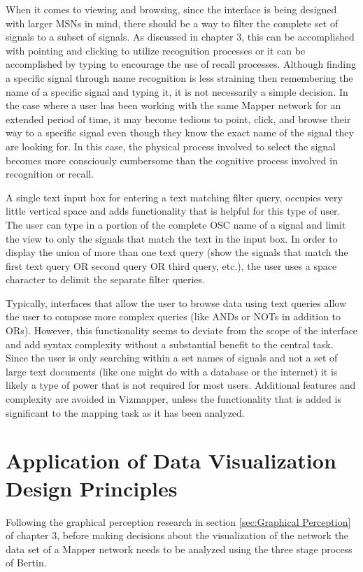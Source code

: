 When it comes to viewing and browsing, since the interface is being designed with larger MSNs in mind, there should be a way to filter the complete set of signals to a subset of signals. As discussed in chapter 3, this can be accomplished with pointing and clicking to utilize recognition processes or it can be accomplished by typing to encourage the use of recall processes. Although finding a specific signal through name recognition is less straining then remembering the name of a specific signal and typing it, it is not necessarily a simple decision. In the case where a user has been working with the same Mapper network for an extended period of time, it may become tedious to point, click, and browse their way to a specific signal even though they know the exact name of the signal they are looking for. In this case, the physical process involved to select the signal becomes more consciously cumbersome than the cognitive process involved in recognition or recall.

A single text input box for entering a text matching filter query, occupies very little vertical space and adds functionality that is helpful for this type of user. The user can type in a portion of the complete OSC name of a signal and limit the view to only the signals that match the text in the input box. In order to display the union of more than one text query (show the signals that match the first text query OR second query OR third query, etc.), the user uses a space character to delimit the separate filter queries. 

Typically, interfaces that allow the user to browse data using text queries allow the user to compose more complex queries (like ANDs or NOTs in addition to ORs). However, this functionality seems to deviate from the scope of the interface and add syntax complexity without a substantial benefit to the central task. Since the user is only searching within a set names of signals and not a set of large text documents (like one might do with a database or the internet) it is likely a type of power that is not required for most users. Additional features and complexity are avoided in Vizmapper, unless the functionality that is added is significant to the mapping task as it has been analyzed.

\section{Application of Data Visualization Design Principles}

Following the graphical perception research in section \ref{sec:Graphical Perception} of chapter 3, before making decisions about the visualization of the network the data set of a Mapper network needs to be analyzed using the three stage process of Bertin.

